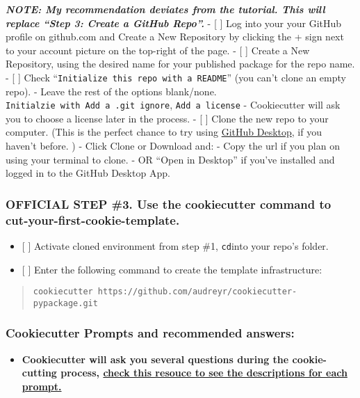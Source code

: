\documentclass[11pt]{article}
\providecommand{\tightlist}{%
      \setlength{\itemsep}{0pt}\setlength{\parskip}{0pt}}
\begin{document}
\textbf{\emph{NOTE: My recommendation deviates from the tutorial. This
will replace ``Step 3: Create a GitHub Repo''.}} - {[} {]} Log into your
your GitHub profile on github.com and Create a New Repository by
clicking the + sign next to your account picture on the top-right of the
page. - {[} {]} Create a New Repository, using the desired name for your
published package for the repo name. - {[} {]} Check
``\texttt{Initialize\ this\ repo\ with\ a\ README}'' (you can't clone an
empty repo). - Leave the rest of the options blank/none.
\texttt{Initialzie\ with\ Add\ a\ .git\ ignore},
\texttt{Add\ a\ license} - Cookiecutter will ask you to choose a license
later in the process. - {[} {]} Clone the new repo to your computer.
(This is the perfect chance to try using
\href{https://desktop.github.com/}{GitHub Desktop}, if you haven't
before. ) - Click Clone or Download and: - Copy the url if you plan on
using your terminal to clone. - OR ``Open in Desktop'' if you've
installed and logged in to the GitHub Desktop App. 

    \hypertarget{official-step-3.-use-the-cookiecutter-command-to-cut-your-first-cookie-template.}{%
\subsubsection{OFFICIAL STEP \#3. Use the cookiecutter command to
cut-your-first-cookie-template.}\label{official-step-3.-use-the-cookiecutter-command-to-cut-your-first-cookie-template.}}

\begin{itemize}
\tightlist
\item
  {[} {]} Activate cloned environment from step \#1, \texttt{cd}into
  your repo's folder.
\item
  {[} {]} Enter the following command to create the template
  infrastructure:
\end{itemize}

\begin{quote}
\texttt{cookiecutter\ https://github.com/audreyr/cookiecutter-pypackage.git}
\end{quote}

\hypertarget{cookiecutter-prompts-and-recommended-answers}{%
\subsubsection{Cookiecutter Prompts and recommended
answers:}\label{cookiecutter-prompts-and-recommended-answers}}

\begin{itemize}
\tightlist
\item
  \textbf{Cookiecutter will ask you several questions during the
  cookie-cutting process,
  \href{https://cookiecutter-pypackage.readthedocs.io/en/latest/prompts.html}{check
  this resouce to see the descriptions for each prompt.}}
\end{itemize}
\end{document}
